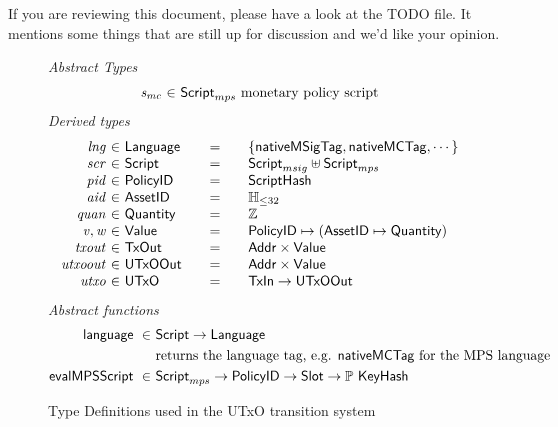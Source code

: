\begin{note}
  If you are reviewing this document, please have a look at the TODO
  file. It mentions some things that are still up for discussion and
  we'd like your opinion.
\end{note}

\begin{figure*}[t!]
  \emph{Abstract Types}
  \begin{equation*}
    \begin{array}{r@{~\in~}l@{~}lr}
      \var{s_{mc}} & \ScriptMPS & \text{monetary policy script}
     \end{array}
  \end{equation*}
  \emph{Derived types}
  \begin{equation*}
    \begin{array}{r@{~\in~}l@{\qquad=\qquad}lr}
      \var{lng} & \Language & \{\mathsf{nativeMSigTag}, \mathsf{nativeMCTag}, \cdots\} \\
      \var{scr} & \Script & \ScriptMSig \uniondistinct \ScriptMPS \\
      \var{pid} & \PolicyID & \ScriptHash \\
      \var{aid} & \AssetID & \mathbb{H}_{\leq 32}\\
      \var{quan} & \Quantity & \Z \\
      \var{v}, \var{w} & \Value
      & \PolicyID \mapsto ( \AssetID \mapsto \Quantity ) \\
      \var{txout}
      & \TxOut
      & \Addr \times \Value
      \\
      \var{utxoout}
      & \UTxOOut
      & \Addr \times \Value \\
      \var{utxo}
      & \UTxO
      & \TxIn \to \UTxOOut
    \end{array}
  \end{equation*}
  \emph{Abstract functions}
  \begin{align*}
    \mathsf{language} ~\in~    & \mathsf{Script} \to \mathsf{Language} \\
                            & \text{returns the language tag, e.g. $\mathsf{nativeMCTag}$ for the MPS language} \\
    \mathsf{evalMPSScript}~\in~& \mathsf{Script}_{mps}\to\mathsf{PolicyID}\to\mathsf{Slot}\to\mathbb{P}~\mathsf{KeyHash} \\
  \end{align*}

  \caption{Type Definitions used in the UTxO transition system}
  \label{fig:defs:utxo-shelley-1}
\end{figure*}

